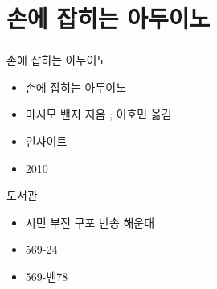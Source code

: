 \documentclass[aspectratio=1610,17pt,xcolor=pdftex,dvipsnames,table,handout]{beamer}
\begin{document}
		\section{ 손에 잡히는 아두이노}
		\begin{frame} [t,plain]
		\frametitle{}

			\begin{block} { 손에 잡히는 아두이노}
			\setlength{\leftmargini}{4em}			
			\begin{itemize}
				\item [제목]  	손에 잡히는 아두이노
				\item [지은이]	마시모 밴지 지음 ; 이호민 옮김
				\item [출판사]	인사이트
				\item [출판일]	2010
			\end{itemize}
			\end{block}						
								
			\begin{block} {도서관}
			\setlength{\leftmargini}{4em}			
			\begin{itemize}
				\item [도서관] 	시민 부전 구포 반송 해운대
				\item [중앙]		569-24
				\item [남구]		569-밴78
			\end{itemize}
			\end{block}						

		\end{frame}						

\end{document}
